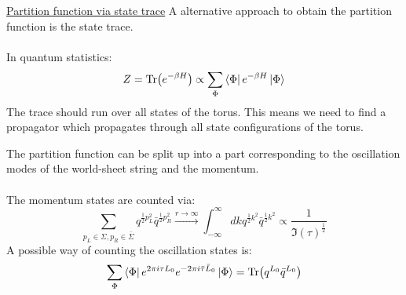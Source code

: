 \documentclass[11pt,aspectratio=169]{beamer}
\begin{document}
\begin{frame}{\underline{Partition function via state trace}}
	A alternative approach to obtain the partition function is the state trace.
	\\~\\
	In quantum statistics:
	\begin{equation}
		Z = \Tr(e^{-\beta H}) \propto \sum_{\Phi}\bra{\Phi} e^{-\beta H} \ket{\Phi}
	\end{equation}
	The trace should run over all states of the torus. This means we need to find a propagator 
	which propagates through all state configurations of the torus.
	

\end{frame}

\begin{frame}
	The partition function can be split up into a part corresponding to the oscillation modes of the world-sheet string and the momentum.
	\\~\\
	The momentum states are counted via:
	\begin{equation}
		\sum_{p_L\in\Sigma, p_R\in\bar{\Sigma}} q^{\frac{1}{2}p_L^2}\bar{q}^{\frac{1}{2}p_R^2}  \xrightarrow{\text{$r \rightarrow \infty$}} \int_{-\infty}^{\infty}dk q^{\frac{1}{2}k^2}\bar{q}^{\frac{1}{2}k^2} \propto \frac{1}{\Im(\tau)^{\frac{1}{2}}}
	\end{equation}	
	A possible way of counting the oscillation states is:
	\begin{equation}
		\sum_{\Phi} \bra{\Phi} e^{2\pi i \tau L_0}e^{-2\pi i \bar{\tau} \bar{L}_0} \ket{\Phi} = \Tr(q^{L_0}\bar{q}^{L_0})
	\end{equation}
\end{frame}
\end{document}
